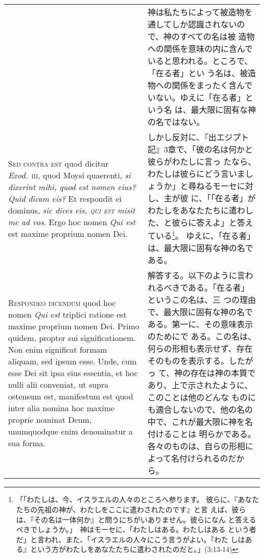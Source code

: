 \documentclass[10pt]{jsarticle} %
\begin{document}
\begin{longtable}{p{21em}p{21em}}
&

神は私たちによって被造物を通してしか認識されないので、神のすべての名は被
 造物への関係を意味の内に含んでいると思われる。ところで、「在る者」とい
 う名は、被造物への関係をまったく含んでいない。ゆえに「在る者」という名
 は、最大限に固有な神の名ではない。


\\


{\scshape Sed contra est} quod dicitur {\itshape
Exod}.~{\scshape iii}, quod Moysi quaerenti, {\itshape si dixerint mihi,
quod est nomen eius? Quid dicam eis?}  Et respondit ei dominus,
{\itshape sic dices eis, {\scshape qui est} misit me ad vos}. Ergo hoc
nomen {\itshape Qui est} est maxime proprium nomen Dei.


&

しかし反対に、『出エジプト記』3章で、「彼の名は何かと彼らがわたしに言っ
たなら、わたしは彼らにどう言いましょうか」と尋ねるモーセに対し、主が彼
に、「「在る者」がわたしをあなたたちに遣わした、と彼らに答えよ」と答え
ている\footnote{「「わたしは、今、イスラエルの人々のところへ参ります。
彼らに、『あなたたちの先祖の神が、わたしをここに遣わされたのです』と言
えば、彼らは、『その名は一体何か』と問うにちがいありません。彼らになん
と答えるべきでしょうか。」　神はモーセに、「わたしはある。わたしはある
という者だ」と言われ、また、「イスラエルの人々にこう言うがよい。『わた
しはある』という方がわたしをあなたたちに遣わされたのだと。」(3:13-14)}。
ゆえに、「在る者」は、最大限に固有な神の名である。

\\


{\scshape Respondeo dicendum} quod hoc nomen {\itshape Qui est}
triplici ratione est maxime proprium nomen Dei. Primo quidem, propter
sui significationem. Non enim significat formam aliquam, sed ipsum
esse. Unde, cum esse Dei sit ipsa eius essentia, et hoc nulli alii
conveniat, ut supra ostensum est, manifestum est quod inter alia nomina
hoc maxime proprie nominat Deum, unumquodque enim denominatur a sua
forma. 


&

解答する。以下のように言われるべきである。「在る者」というこの名は、三
つの理由で、最大限に固有な神の名である。第一に、その意味表示のためにで
ある。この名は、何らの形相も表示せず、存在そのものを表示する。したがっ
て、神の存在は神の本質であり、上で示されたように、このことは他のどんな
ものにも適合しないので、他の名の中で、これが最大限に神を名付けることは
明らかである。各々のものは、自らの形相によって名付けられるのだから。


\end{longtable}
\end{document}
